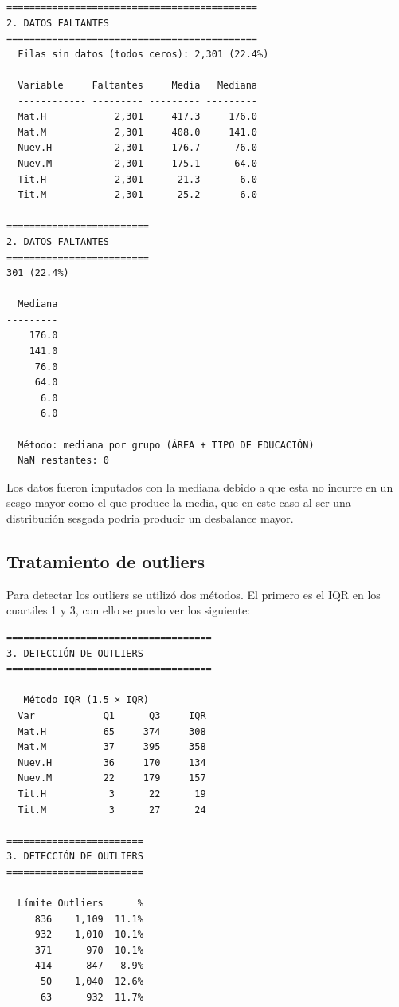 \documentclass[10pt, twocolumn]{article}
\begin{document}
\begin{verbatim}
============================================
2. DATOS FALTANTES                          
============================================
  Filas sin datos (todos ceros): 2,301 (22.4%)

  Variable     Faltantes     Media   Mediana
  ------------ --------- --------- ---------
  Mat.H            2,301     417.3     176.0
  Mat.M            2,301     408.0     141.0
  Nuev.H           2,301     176.7      76.0
  Nuev.M           2,301     175.1      64.0
  Tit.H            2,301      21.3       6.0
  Tit.M            2,301      25.2       6.0

========================= 
2. DATOS FALTANTES                                           
========================= 
301 (22.4%)               
                          
  Mediana                 
---------                 
    176.0                 
    141.0                 
     76.0                 
     64.0                 
      6.0                 
      6.0                 

  Método: mediana por grupo (ÁREA + TIPO DE EDUCACIÓN)
  NaN restantes: 0
\end{verbatim}

Los datos fueron imputados con la mediana debido a que esta no incurre en un sesgo mayor como el que produce la media, que en este caso al ser una distribución sesgada podria producir un desbalance mayor.

\subsection{Tratamiento de outliers}

Para detectar los outliers se utilizó dos métodos. El primero es el IQR en los cuartiles 1 y 3, con ello se puedo ver los siguiente:

\begin{verbatim}
====================================
3. DETECCIÓN DE OUTLIERS
====================================

   Método IQR (1.5 × IQR) 
  Var            Q1      Q3     IQR 
  Mat.H          65     374     308 
  Mat.M          37     395     358 
  Nuev.H         36     170     134 
  Nuev.M         22     179     157 
  Tit.H           3      22      19 
  Tit.M           3      27      24 

======================== 
3. DETECCIÓN DE OUTLIERS
======================== 
                         
  Límite Outliers      % 
     836    1,109  11.1% 
     932    1,010  10.1% 
     371      970  10.1% 
     414      847   8.9% 
      50    1,040  12.6% 
      63      932  11.7% 
\end{verbatim}
\end{document}
